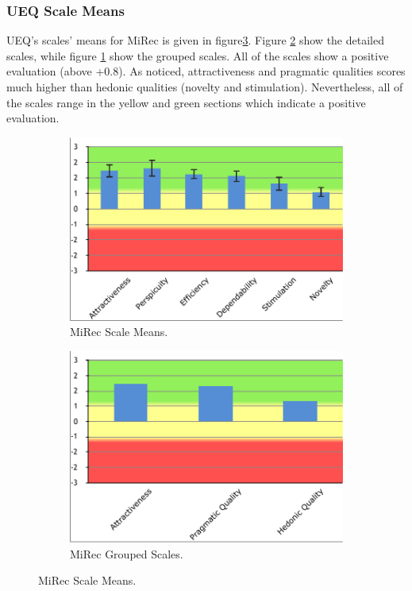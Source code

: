 \subsubsection{UEQ Scale Means}
UEQ's scales' means for MiRec is given in figure\ref{fig:figure54}. Figure
\ref{fig:figure54a} show the detailed scales, while figure \ref{fig:figure54b}
show the grouped scales. All of the scales show a positive evaluation (above
+0.8). As noticed, attractiveness and pragmatic qualities scores much higher
than hedonic qualities (novelty and stimulation). Nevertheless, all of the scales range in
the yellow and green sections which indicate a positive evaluation.
\begin{figure}[htbp]
\centering
\begin{subfigure}[b]{0.3\textwidth}
\includegraphics[width=\textwidth]{figures/mirec-results}
\caption{MiRec Scale Means.}
\label{fig:figure54b}
\end{subfigure}
\begin{subfigure}[b]{0.3\textwidth}
\includegraphics[width=\textwidth]{figures/mirec-results2}
\caption{MiRec Grouped Scales.}
\label{fig:figure54a}
\end{subfigure}
\caption{MiRec Scale Means.}
\label{fig:figure54}
\end{figure}
